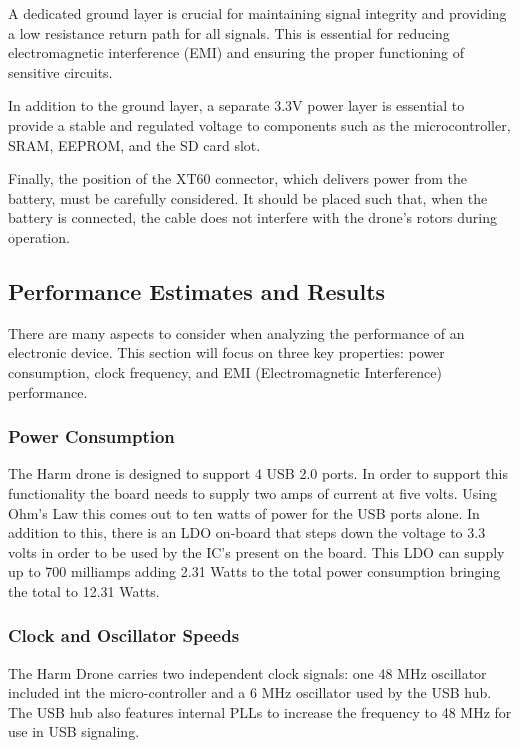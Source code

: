 \documentclass[12pt]{article}
\begin{document}
\par A dedicated ground layer is crucial for maintaining signal integrity and providing a low resistance return path for all signals. This is essential for reducing electromagnetic interference (EMI) and ensuring the proper functioning of sensitive circuits.

\par In addition to the ground layer, a separate 3.3V power layer is essential to provide a stable and regulated voltage to components such as the microcontroller, SRAM, EEPROM, and the SD card slot.

\par Finally, the position of the XT60 connector, which delivers power from the battery, must be carefully considered. It should be placed such that, when the battery is connected, the cable does not interfere with the drone’s rotors during operation.

\subsection{Performance Estimates and Results}
There are many aspects to consider when analyzing the performance of an electronic device. This section will focus on three key properties: power consumption, clock frequency, and EMI (Electromagnetic Interference) performance.
\subsubsection{Power Consumption}
The Harm drone is designed to support 4 USB 2.0 ports. In order to support this functionality the board needs to supply two amps of current at five volts. Using Ohm's Law this comes out to ten watts of power for the USB ports alone. In addition to this, there is an LDO on-board that steps down the voltage to 3.3 volts in order to be used by the IC's present on the board. This LDO can supply up to 700 milliamps adding 2.31 Watts to the total power consumption bringing the total to 12.31 Watts.
\subsubsection{Clock and Oscillator Speeds}
The Harm Drone carries two independent clock signals: one 48 MHz oscillator included int the micro-controller and a 6 MHz oscillator used by the USB hub. The USB hub also features internal PLLs to increase the frequency to 48 MHz for use in USB signaling.
\end{document}
